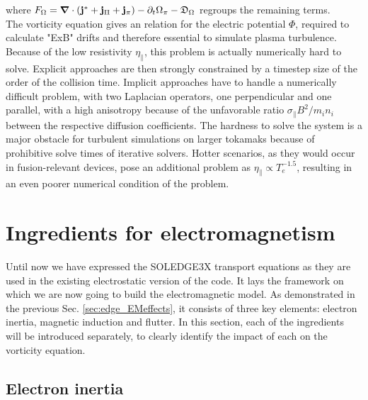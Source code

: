 where $F_\Omega = \grad\cdot\left(\mathbf{j}^* + \mathbf{j}_{\Pi} + \mathbf{j}_{\pi}\right) - \partial_t \Omega_\pi  - \mathfrak{D}_\Omega$ regroups the remaining terms. \\
The vorticity equation gives an relation for the electric potential $\Phi$, required to calculate "ExB" drifts and therefore essential to simulate plasma turbulence. Because of the low resistivity $\eta_\parallel$, this problem is actually numerically hard to solve. Explicit approaches are then strongly constrained by a timestep size of the order of the collision time. Implicit approaches have to handle a numerically difficult problem, with two Laplacian operators, one perpendicular and one parallel, with a high anisotropy because of the unfavorable ratio $\sigma_\parallel B^2 / m_in_i$ between the respective diffusion coefficients. The hardness to solve the system is a major obstacle for turbulent simulations on larger tokamaks because of prohibitive solve times of iterative solvers. Hotter scenarios, as they would occur in fusion-relevant devices, pose an additional problem as $\eta_\parallel\propto T_e^{-1.5}$, resulting in an even poorer numerical condition of the problem. 



\section{Ingredients for electromagnetism}
\label{sec:S3X_electromagneticModel}

Until now we have expressed the SOLEDGE3X transport equations as they are used in the existing electrostatic version of the code. It lays the framework on which we are now going to build the electromagnetic model. As demonstrated in the previous Sec. \ref{sec:edge_EMeffects}, it consists of three key elements: electron inertia, magnetic induction and flutter. In this section, each of the ingredients will be introduced separately, to clearly identify the impact of each on the vorticity equation. 


\subsection{Electron inertia}
\label{ssec:ModelElectronInertia}


